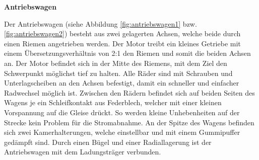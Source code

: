 \documentclass[../../main.tex]{subfiles}
\begin{document}
\textbf{Antriebswagen}

Der Antriebswagen (siehe Abbildung \ref{fig:antriebswagen1} bzw. \ref{fig:antriebswagen2}) besteht aus zwei gelagerten Achsen, welche beide durch einen Riemen angetrieben werden. Der Motor treibt ein kleines Getriebe mit einem Übersetzungsverhältnis von 2:1 den Riemen und somit die beiden Achsen an. Der Motor befindet sich in der Mitte des Riemens, mit dem Ziel den Schwerpunkt möglichst tief zu halten. Alle Räder sind mit Schrauben und Unterlagscheiben an den Achsen befestigt, damit ein schneller und einfacher Radwechsel möglich ist. Zwischen den Rädern befindet sich auf beiden Seiten des Wagens je ein Schleifkontakt aus Federblech, welcher mit einer kleinen Vorspannung auf die Gleise drückt. So werden kleine Unhebenheiten auf der Strecke kein Problem für die Stromabnahme. An der Spitze des Wagens befinden sich zwei Kamerhalterungen, welche einstellbar und mit einem Gummipuffer gedämpft sind. Durch einen Bügel und einer Radiallagerung ist der Antriebswagen mit dem Ladungsträger verbunden.\\
\end{document}
